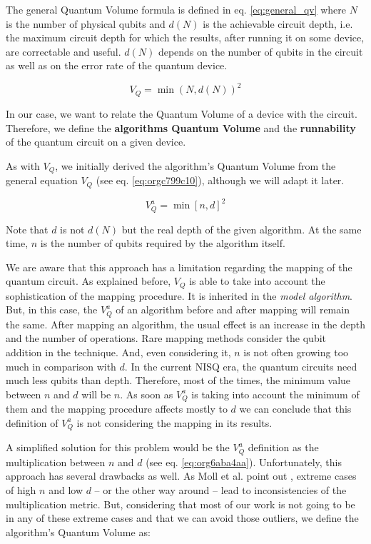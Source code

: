 The general Quantum Volume formula is defined in eq. \ref{eq:general_qv} where \(N\) is the number of physical qubits and \(d(N)\) is the achievable circuit depth, i.e. the maximum circuit depth for which the results, after running it on some device, are correctable and useful.
\(d(N)\) depends on the number of qubits in the circuit as well as on the error rate of the quantum device.

\begin{equation}
\label{eq:general_qv}
V_Q = \min (N, d(N))^2
\end{equation}

In our case, we want to relate the Quantum Volume of a device with the circuit.
Therefore, we define the \textbf{algorithms Quantum Volume} and the \textbf{runnability} of the quantum circuit on a given device.

As with \(V_Q\), we initially derived the algorithm's Quantum Volume from the general equation \(V_Q\) (see eq. \ref{eq:orgc799c10}), although we will adapt it later.

\begin{equation}
\label{eq:orgc799c10}
V_Q^a = \min \left[ n,d \right]^2
\end{equation}

Note that \(d\) is not \(d(N)\) but the real depth of the given algorithm.
At the same time, \(n\) is the number of qubits required by the algorithm itself.

We are aware that this approach has a limitation regarding the mapping of the quantum circuit.
As explained before, \(V_Q\) is able to take into account the sophistication of the mapping procedure.
It is inherited in the \emph{model algorithm}.
But, in this case, the \(V^a_Q\) of an algorithm before and after mapping will remain the same.
After mapping an algorithm, the usual effect is an increase in the depth and the number of operations.
Rare mapping methods consider the qubit addition in the technique.
And, even considering it, \(n\) is not often growing too much in comparison with \(d\).
In the current NISQ era, the quantum circuits need much less qubits than depth.
Therefore, most of the times, the minimum value between \(n\) and \(d\) will be \(n\).
As soon as \(V^a_Q\) is taking into account the minimum of them and the mapping procedure affects mostly to \(d\) we can conclude that this definition of \(V^a_Q\) is not considering the mapping in its results.

A simplified solution for this problem would be the \(V^a_Q\) definition as the multiplication between \(n\) and \(d\) (see eq. \ref{eq:org6aba4aa}).
Unfortunately, this approach has several drawbacks as well.
As Moll et al. point out \cite{Moll_2018}, extreme cases of high \(n\) and low \(d\) -- or the other way around -- lead to inconsistencies of the multiplication metric.
But, considering that most of our work is not going to be in any of these extreme cases and that we can avoid those outliers, we define the algorithm's Quantum Volume as:

